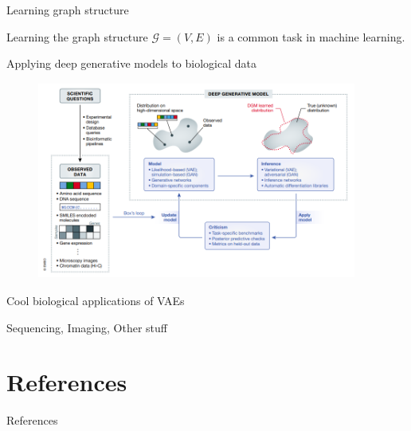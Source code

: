 \documentclass{beamer}					%
\begin{document}
\begin{frame}{Learning graph structure}

Learning the graph structure $\mathcal{G}=(V,E)$ is a common task in machine learning.\\

\end{frame}

\begin{frame}{Applying deep generative models to biological data}
\begin{figure}
\includegraphics[height=65mm, width=105mm]{dbm}
\end{figure}
\end{frame}

\begin{frame}{Cool biological applications of VAEs}

Sequencing, Imaging, Other stuff

\end{frame}

\section{References}

\begin{frame}[allowframebreaks]{References}
	\tiny
	
\end{frame}
\end{document}
